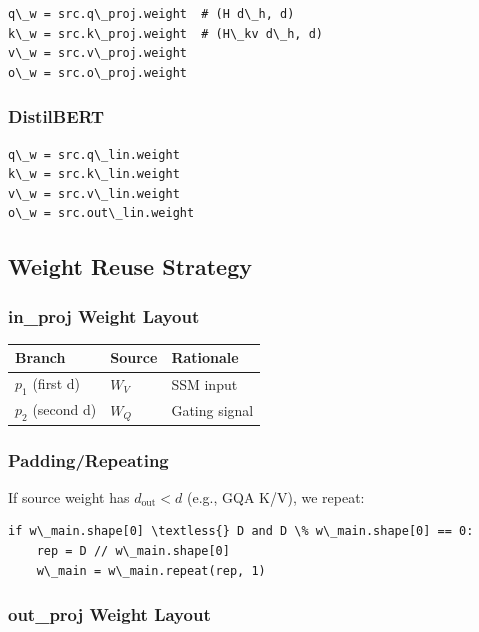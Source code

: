 \begin{lstlisting}
q\_w = src.q\_proj.weight  # (H d\_h, d)
k\_w = src.k\_proj.weight  # (H\_kv d\_h, d)
v\_w = src.v\_proj.weight
o\_w = src.o\_proj.weight
\end{lstlisting}

\subsubsection{DistilBERT}

\begin{lstlisting}
q\_w = src.q\_lin.weight
k\_w = src.k\_lin.weight
v\_w = src.v\_lin.weight
o\_w = src.out\_lin.weight
\end{lstlisting}

\subsection{Weight Reuse Strategy}

\subsubsection{in\_proj Weight Layout}

\begin{table}[H]
\centering
\small
\begin{tabular}{lll}
\toprule
\textbf{Branch} & \textbf{Source} & \textbf{Rationale} \\
\midrule
$p_1$ (first d) & $W_V$ & SSM input \\
$p_2$ (second d) & $W_Q$ & Gating signal \\
\bottomrule
\end{tabular}
\end{table}

\subsubsection{Padding/Repeating}

If source weight has $d_\text{out} < d$ (e.g., GQA K/V), we repeat:

\begin{lstlisting}
if w\_main.shape[0] \textless{} D and D \% w\_main.shape[0] == 0:
    rep = D // w\_main.shape[0]
    w\_main = w\_main.repeat(rep, 1)
\end{lstlisting}

\subsubsection{out\_proj Weight Layout}

